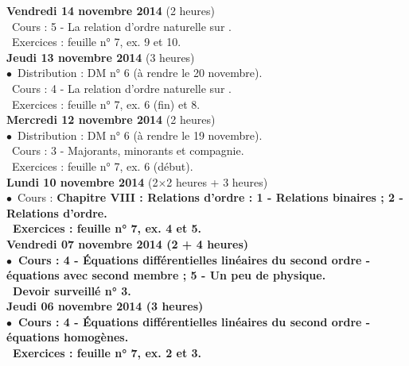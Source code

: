 \documentclass[12pt,a4paper]{article}
\begin{document}
\noindent\textbf{ \bf Vendredi 14 novembre 2014 \rm}(2 heures)\\
\bu\ Cours : 5 - La relation d'ordre naturelle sur \R.\\
\bu\ Exercices : feuille n° 7, ex. 9 et 10.\vspace{.4cm}\\

\noindent\textbf{ \bf Jeudi 13 novembre 2014 \rm}(3 heures)\\
$\bullet$\ Distribution : DM n° 6 (à rendre le 20 novembre).\\
\bu\ Cours : 4 - La relation d'ordre naturelle sur \N.\\
\bu\ Exercices : feuille n° 7, ex. 6 (fin) et 8.\vspace{.4cm}\\

\noindent\textbf{\bf Mercredi 12 novembre 2014 \rm} (2 heures)\\
$\bullet$\ Distribution : DM n° 6 (à rendre le 19 novembre).\\
\bu\ Cours : 3 - Majorants, minorants et compagnie.\\
\bu\ Exercices : feuille n° 7, ex. 6 (début).\vspace{.4cm}\\
 
\noindent\textbf{ Lundi 10 novembre 2014 \rm} (2$\times$2 heures + 3 heures)\\
$\bullet$\ Cours : \bf Chapitre VIII \rm : Relations d'ordre : 1 - Relations 
binaires ; 2 - Relations d'ordre.\\
\bu\ Exercices : feuille n° 7, ex. 4 et 5.\vspace{.4cm}\\
% 
\noindent\textbf{ \bf Vendredi 07 novembre 2014 \rm}(2 + 4 heures)\\
$\bullet$\ Cours : 4 - Équations différentielles linéaires du second ordre -
équations avec second membre ; 5 - Un peu de physique.\\
\bu\ Devoir surveillé n° 3.\vspace{.4cm}\\

\noindent\textbf{ \bf Jeudi 06 novembre 2014 \rm}(3 heures)\\
$\bullet$\ Cours : 4 - Équations différentielles linéaires du second ordre -
équations homogènes.\\
\bu\ Exercices : feuille n° 7, ex. 2 et 3.\vspace{.4cm}\\
\end{document}
